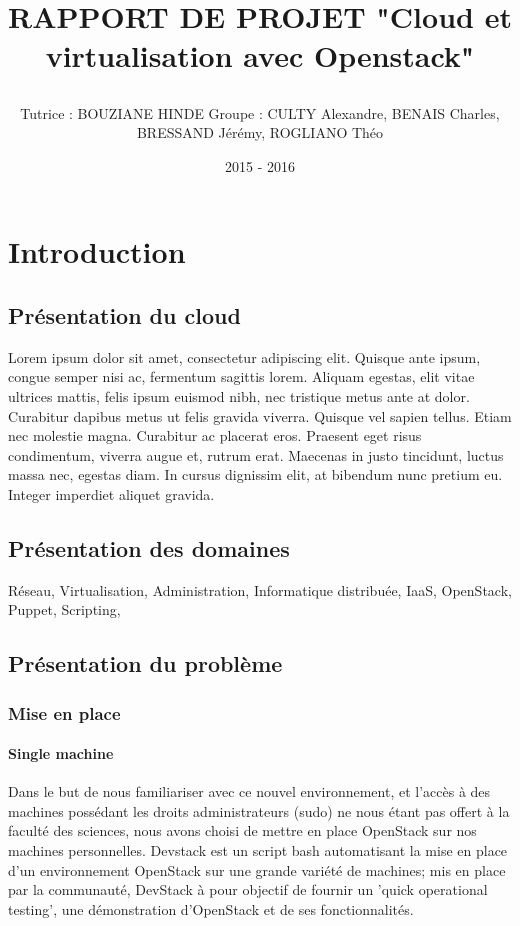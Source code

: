 \documentclass{report}
\title{%
    \begin{minipage}\linewidth
        \centering
        RAPPORT DE PROJET
        \linebreak
        \large "Cloud et virtualisation avec Openstack"
    \end{minipage}
}
\author{%
    \begin{minipage}\linewidth
        \centering
        Tutrice : BOUZIANE HINDE\linebreak
        \linebreak
        \large Groupe : CULTY Alexandre, BENAIS Charles, BRESSAND Jérémy, ROGLIANO Théo
    \end{minipage}
}
\date{2015 - 2016}
\newcommand{\mychapter}[2]{
    \setcounter{chapter}{0}
    \setcounter{section}{0}
    \chapter*{#2}
    \addcontentsline{toc}{chapter}{#2}
}
\begin{document}
\maketitle %


\newpage
\mychapter{1}{Introduction}
\section{Présentation du cloud}
    \large{
        Lorem ipsum dolor sit amet, consectetur adipiscing elit. Quisque ante ipsum,
        congue semper nisi ac, fermentum sagittis lorem. Aliquam egestas, elit vitae
        ultrices mattis, felis ipsum euismod nibh, nec tristique metus ante at dolor.
        Curabitur dapibus metus ut felis gravida viverra. Quisque vel sapien tellus.
        Etiam nec molestie magna. Curabitur ac placerat eros. Praesent eget risus
        condimentum, viverra augue et, rutrum erat. Maecenas in justo tincidunt,
        luctus massa nec, egestas diam. In cursus dignissim elit, at bibendum nunc
        pretium eu. Integer imperdiet aliquet gravida.
}


\newpage
\section{Présentation des domaines}
Réseau, Virtualisation, Administration, Informatique distribuée, IaaS,
OpenStack, Puppet, Scripting, 

\section{Présentation du problème}
\subsection{Mise en place}
\subsubsection{Single machine}
Dans le but de nous familiariser avec ce nouvel environnement,
et l'accès à des machines possédant les droits administrateurs (sudo)
ne nous étant pas offert à la faculté des sciences,
nous avons choisi de mettre en place OpenStack sur nos machines personnelles.\break
Devstack est un script bash automatisant la mise en place d'un environnement OpenStack 
sur une grande variété de machines; mis en place par la communauté, 
DevStack à pour objectif de fournir un 'quick operational testing', une démonstration 
d'OpenStack et de ses fonctionnalités.
\end{document}
